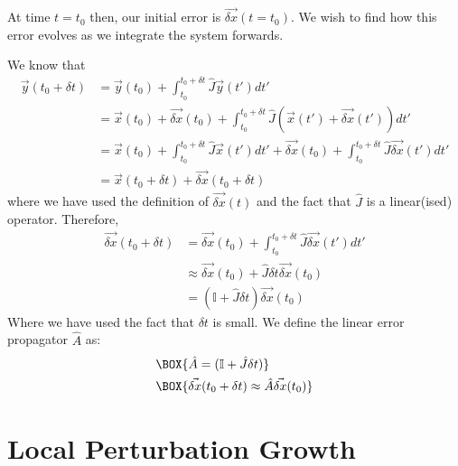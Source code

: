 At time $t=t_0$ then, our initial error is $\vec{\delta x}(t=t_0)$. We wish to find how this error evolves as we integrate the system forwards.

We know that
\begin{align*}
    \vec{y}(t_0+\delta t) & = \vec{y}(t_0) + \int_{t_0}^{t_0+\delta t} \hat{J} \vec{y}(t') dt'\\
    & = \vec{x}(t_0) + \vec{\delta x}(t_0)+ \int_{t_0}^{t_0+\delta t} \hat{J} (\vec{x}(t') + \vec{\delta x}(t')) dt'\\
    & = \vec{x}(t_0) + \int_{t_0}^{t_0+\delta t} \hat{J} \vec{x}(t') dt'+ \vec{\delta x}(t_0)+ \int_{t_0}^{t_0+\delta t} \hat{J} \vec{\delta x}(t') dt'\\
    & = \vec{x}(t_0+\delta t) + \vec{\delta x}(t_0+\delta t)
\end{align*}
where we have used the definition of $\vec{\delta x}(t)$ and the fact that $\hat{J}$ is a linear(ised) operator. Therefore, 
\begin{align*}
    \vec{\delta x}(t_0+\delta t) & = \vec{\delta x}(t_0)+ \int_{t_0}^{t_0+\delta t} \hat{J} \vec{\delta x}(t') dt'\\
    & \approx \vec{\delta x}(t_0)+ \hat{J} \delta t\vec{\delta x}(t_0)\\
    & = (\mathbb{I} + \hat{J}\delta t)\vec{\delta x}(t_0)
\end{align*}
Where we have used the fact that $\delta t$ is small. We define the linear error propagator $\hat{A}$ as:
\begin{align}
    & \BOX{\hat{A} = (\mathbb{I} + \hat{J}\delta t)}\\
    & \BOX{\vec{\delta x}(t_0+\delta t)\approx\hat{A}\vec{\delta x}(t_0)} \label{dx}
\end{align}

\section{Local Perturbation Growth}

